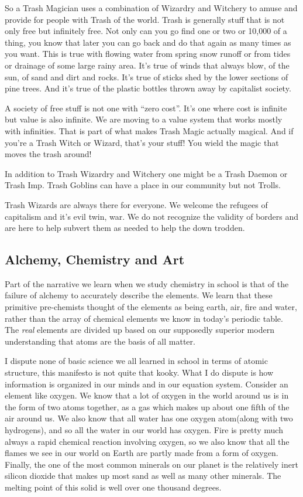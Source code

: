 So a Trash Magician uses a combination of Wizardry and Witchery to amuse
and provide for people with Trash of the world. Trash is generally stuff
that is not only free but infinitely free. Not only can you go find one
or two or 10,000 of a thing, you know that later you can go back and do
that again as many times as you want. This is true with flowing water
from spring snow runoff or from tides or drainage of some large rainy
area. It's true of winds that always blow, of the sun, of sand and dirt
and rocks. It's true of sticks shed by the lower sections of pine trees.
And it's true of the plastic bottles thrown away by capitalist society.

A society of free stuff is not one with ``zero cost''. It's one where
cost is infinite but value is also infinite. We are moving to a value
system that works mostly with infinities. That is part of what makes
Trash Magic actually magical. And if you're a Trash Witch or Wizard,
that's your stuff! You wield the magic that moves the trash around!

In addition to Trash Wizardry and Witchery one might be a Trash Daemon
or Trash Imp. Trash Goblins can have a place in our community but not
Trolls.

Trash Wizards are always there for everyone. We welcome the refugees of
capitalism and it's evil twin, war. We do not recognize the validity of
borders and are here to help subvert them as needed to help the down
trodden.

\subsection{Alchemy, Chemistry and Art}\label{alchemy-chemistry-and-art}

Part of the narrative we learn when we study chemistry in school is that
of the failure of alchemy to accurately describe the elements. We learn
that these primitive pre-chemists thought of the elements as being
earth, air, fire and water, rather than the array of chemical elements
we know in today's periodic table. The \emph{real} elements are divided
up based on our supposedly superior modern understanding that atoms are
the basis of all matter.

I dispute none of basic science we all learned in school in terms of
atomic structure, this manifesto is not quite that kooky. What I do
dispute is how information is organized in our minds and in our equation
system. Consider an element like oxygen. We know that a lot of oxygen in
the world around us is in the form of two atoms together, as a gas which
makes up about one fifth of the air around us. We also know that all
water has one oxygen atom(along with two hydrogens), and so all the
water in our world has oxygen. Fire is pretty much always a rapid
chemical reaction involving oxygen, so we also know that all the flames
we see in our world on Earth are partly made from a form of oxygen.
Finally, the one of the most common minerals on our planet is the
relatively inert silicon dioxide that makes up most sand as well as many
other minerals. The melting point of this solid is well over one
thousand degrees.

